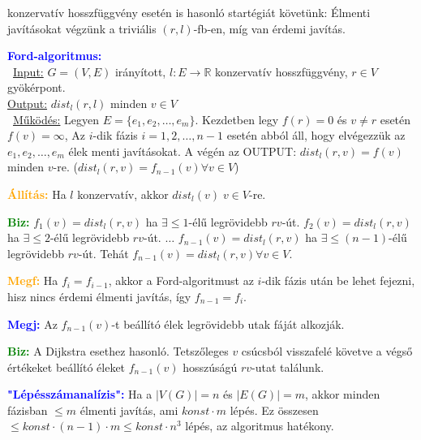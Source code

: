\documentclass[../../szobeli.tex]{subfiles}
\begin{document}
\begin{itemize}
        konzervatív hosszfüggvény esetén is hasonló startégiát követünk: Élmenti javításokat végzünk a triviális $(r,l)$-fb-en, míg van érdemi javítás.

        \textcolor{blue}{\textbf{Ford-algoritmus:}} \\ \underline{Input:} $G = (V,E)$ irányított, $l:E \rightarrow \mathbb{R}$ konzervatív hosszfüggvény, $r \in V$ gyökérpont. \\ \underline{Output:} $dist_l(r,l)$ minden $ v \in V$ \\ \underline{Működés:} Legyen $E = \{e_1, e_2,\dots, e_m\}$. Kezdetben legy $f(r)=0$ és $v\neq r$ esetén $f(v)=\infty$, Az $i$-dik fázis $i=1 ,2 ,\dots, n-1$ esetén abból áll, hogy elvégezzük az $e_1, e_2,\dots, e_m$ élek menti javításokat. A végén az OUTPUT: $dist_l(r,v) = f(v)$ minden $v$-re. ($dist_l(r,v) = f_{n-1}(v)\forall v\in V$)

        \textcolor{orange}{\textbf{Állítás:}} Ha $l$ konzervatív, akkor $dist_l(v)\; v \in V$-re.

        \textcolor{green}{\textbf{Biz:}} $f_1(v) = dist_l(r,v)$ ha $\exists \leq 1$-élű legrövidebb $rv$-út. $f_2(v) = dist_l(r,v)$ ha $\exists \leq 2$-élű legrövidebb $rv$-út. $\dots$ $f_{n-1}(v) = dist_l(r,v)$ ha $\exists \leq (n-1)$-élű legrövidebb $rv$-út. Tehát $f_{n-1}(v) = dist_l(r,v) \forall v \in V$.   

        \textcolor{orange}{\textbf{Megf:}} Ha $f_i = f_{i-1}$, akkor a Ford-algoritmust az $i$-dik fázis után be lehet fejezni, hisz nincs érdemi élmenti javítás, így $f_{n-1} = f_i$.

        \textcolor{blue}{\textbf{Megj:}} Az $f_{n-1}(v)$-t beállító élek legrövidebb utak fáját alkozják. 

        \textcolor{green}{\textbf{Biz:}} A Dijkstra esethez hasonló. Tetszőleges $v$ csúcsból visszafelé követve a végső értékeket beállító éleket $f_{n-1}(v)$ hosszúságú $rv$-utat találunk.   

        \textcolor{blue}{\textbf{"Lépésszámanalízis":}} Ha a $|V(G)| = n$ és $|E(G)| = m$, akkor minden fázisban $\leq m$ élmenti javítás, ami $konst \cdot m$ lépés. Ez összesen $\leq konst \cdot (n-1) \cdot m \leq konst \cdot n^3$ lépés, az algoritmus hatékony.

    \end{itemize}
\end{document}
